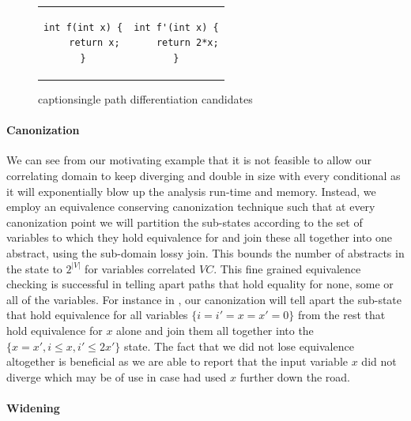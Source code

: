 
\begin{figure}
\begin{tabular}{cc}
\centering
\begin{lstlisting}
int f(int x) {
    return x;
}
\end{lstlisting}
&
\begin{lstlisting}
int f'(int x) {
    return 2*x;
}
\end{lstlisting}
\end{tabular}
caption{single path differentiation candidates}
\end{figure}

\paragraph{Canonization}
We can see from our motivating example that it is not feasible to allow our correlating domain to keep diverging and double in size with every conditional as it will exponentially blow up the analysis run-time and memory. Instead, we employ an equivalence conserving canonization technique such that at every canonization point we will partition the sub-states according to the set of variables to which they hold equivalence for and join these all together into one abstract, using the sub-domain lossy join. This bounds the number of abstracts in the state to $2^{|V|}$ for variables correlated $VC$. This fine grained equivalence checking is successful in telling apart paths that hold equality for none, some or all of the variables. For instance in , our canonization will tell apart the sub-state that hold equivalence for all variables $\{i=i'=x=x'=0\}$ from the rest that hold equivalence for $x$ alone and join them all together into the $\{x=x',i \leq x, i' \leq 2x'\}$ state. The fact that we did not lose equivalence altogether is beneficial as we are able to report that the input variable $x$ did not diverge which may be of use in case  had used $x$ further down the road.

\paragraph{Widening}




